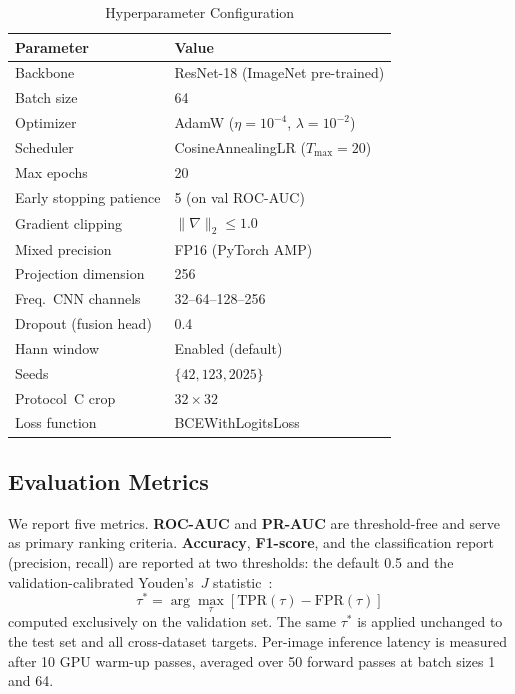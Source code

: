 \documentclass[conference]{IEEEtran}
\begin{document}
\begin{table}[t]
\caption{Hyperparameter Configuration}
\label{tab:hyperparams}
\centering
\begin{tabular}{ll}
\toprule
\textbf{Parameter} & \textbf{Value} \\
\midrule
Backbone & ResNet-18 (ImageNet pre-trained) \\
Batch size & 64 \\
Optimizer & AdamW ($\eta{=}10^{-4}$, $\lambda{=}10^{-2}$) \\
Scheduler & CosineAnnealingLR ($T_{\max}{=}20$) \\
Max epochs & 20 \\
Early stopping patience & 5 (on val ROC-AUC) \\
Gradient clipping & $\|\nabla\|_2 \leq 1.0$ \\
Mixed precision & FP16 (PyTorch AMP) \\
Projection dimension & 256 \\
Freq.\ CNN channels & 32--64--128--256 \\
Dropout (fusion head) & 0.4 \\
Hann window & Enabled (default) \\
Seeds & $\{42, 123, 2025\}$ \\
Protocol~C crop & $32 \times 32$ \\
Loss function & BCEWithLogitsLoss \\
\bottomrule
\end{tabular}
\end{table}

\subsection{Evaluation Metrics}

We report five metrics. \textbf{ROC-AUC} and \textbf{PR-AUC} are threshold-free and serve as primary ranking criteria. \textbf{Accuracy}, \textbf{F1-score}, and the classification report (precision, recall) are reported at two thresholds: the default 0.5 and the validation-calibrated Youden's~$J$ statistic~\cite{youden1950index}:
\begin{equation}
\label{eq:youden}
\tau^* = \arg\max_\tau \left[\text{TPR}(\tau) - \text{FPR}(\tau)\right]
\end{equation}
computed exclusively on the validation set. The same $\tau^*$ is applied unchanged to the test set and all cross-dataset targets. Per-image inference latency is measured after 10 GPU warm-up passes, averaged over 50 forward passes at batch sizes 1 and 64.
\end{document}
